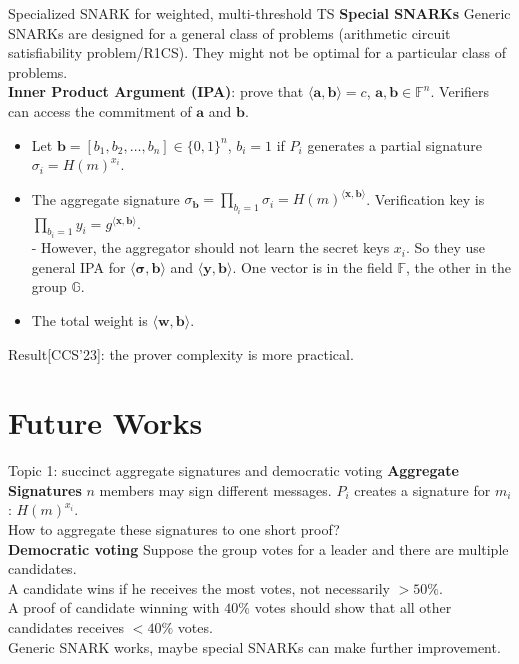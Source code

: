 \documentclass[10pt]{beamer}
\begin{document}
\begin{frame}{Specialized SNARK for weighted, multi-threshold TS}
\textbf{Special SNARKs} Generic SNARKs are designed for a general class of problems (arithmetic circuit satisfiability problem/R1CS). They might not be optimal for a particular class of problems. \\

\textbf{Inner Product Argument (IPA)}: prove that $\langle \mathbf{a}, \mathbf{b}\rangle =c$, $\mathbf{a},\mathbf{b}\in \mathbb{F}^n$. Verifiers can access the commitment of $\mathbf{a}$ and $\mathbf{b}$. 
\pause
\begin{itemize}
    \item  Let $\mathbf{b} = [b_1, b_2,\dots, b_n]\in \{0,1\}^n$, $b_i=1$ if $P_i$ generates a partial signature $\sigma_i = H(m)^{x_i}$. 
    \item The aggregate signature $\sigma_{\mathbf{b}} = \prod_{b_i=1} \sigma_i = H(m)^{\langle\mathbf{x}, \mathbf{b}\rangle}$. Verification key is $\prod_{b_i=1}y_i = g^{\langle\mathbf{x}, \mathbf{b}\rangle}$. \\
        - However, the aggregator should not learn the secret keys $x_i$. So they use general IPA for $\langle\mathbf{\sigma}, \mathbf{b}\rangle$ and $\langle\mathbf{y}, \mathbf{b}\rangle$. One vector is in the field $\mathbb{F}$, the other in the group $\mathbb{G}$. 
    \item The total weight is $\langle\mathbf{w}, \mathbf{b}\rangle$. 
\end{itemize}


Result[CCS'23]: the prover complexity is more practical. 
\end{frame}

\section{Future Works}

\begin{frame}{Topic 1: succinct aggregate signatures and democratic voting}
\textbf{Aggregate Signatures}  $n$ members may sign different messages. $P_i$ creates a signature for $m_i$: $H(m)^{x_i}$. \\
How to aggregate these signatures to one short proof? \\
\vspace{0.5em}
\pause 
\textbf{Democratic voting} Suppose the group votes for a leader and there are multiple candidates. \\
A candidate wins if he receives the most votes, not necessarily $>50\%$. \\
A proof of candidate winning with $40\%$ votes should show that all other candidates receives $<40\%$ votes. \\
\pause 
\vspace{0.5em}
Generic SNARK works, maybe special SNARKs can make further improvement. 
\end{frame}
\end{document}
